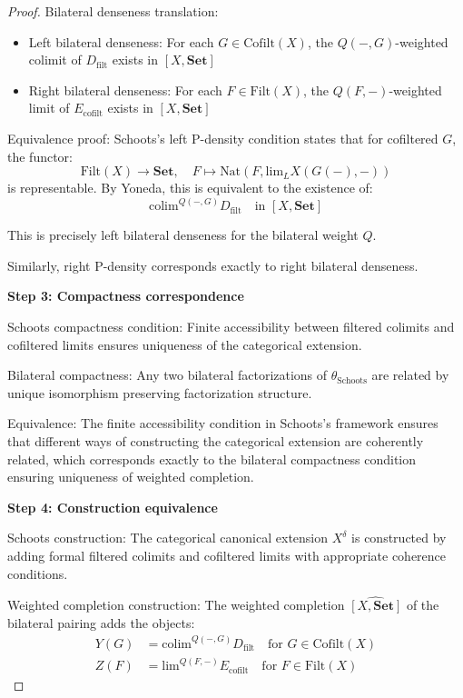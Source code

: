 \documentclass[11pt]{article}
\theoremstyle{plain}
\theoremstyle{definition}
\theoremstyle{remark}
\newcommand{\colim}{\mathrm{colim}}
\renewcommand{\lim}{\mathrm{lim}}
\newcommand{\wh}[1]{\widehat{#1}}
\begin{document}
\begin{proof}
Bilateral denseness translation:
\begin{itemize}
\item Left bilateral denseness: For each $G \in \text{Cofilt}(X)$, the $Q(-, G)$-weighted colimit of $D_{\text{filt}}$ exists in $[X, \mathbf{Set}]$
\item Right bilateral denseness: For each $F \in \text{Filt}(X)$, the $Q(F, -)$-weighted limit of $E_{\text{cofilt}}$ exists in $[X, \mathbf{Set}]$
\end{itemize}

Equivalence proof: 
Schoots's left P-density condition states that for cofiltered $G$, the functor:
$$\text{Filt}(X) \to \mathbf{Set}, \quad F \mapsto \text{Nat}(F, \lim_L X(G(-), -))$$
is representable. By Yoneda, this is equivalent to the existence of:
$$\colim^{Q(-, G)} D_{\text{filt}} \quad \text{in } [X, \mathbf{Set}]$$

This is precisely left bilateral denseness for the bilateral weight $Q$.

Similarly, right P-density corresponds exactly to right bilateral denseness.

\textbf{Step 3: Compactness correspondence}

Schoots compactness condition: Finite accessibility between filtered colimits and cofiltered limits ensures uniqueness of the categorical extension.

Bilateral compactness: Any two bilateral factorizations of $\theta_{\text{Schoots}}$ are related by unique isomorphism preserving factorization structure.

Equivalence: The finite accessibility condition in Schoots's framework ensures that different ways of constructing the categorical extension are coherently related, which corresponds exactly to the bilateral compactness condition ensuring uniqueness of weighted completion.

\textbf{Step 4: Construction equivalence}

Schoots construction: The categorical canonical extension $X^{\delta}$ is constructed by adding formal filtered colimits and cofiltered limits with appropriate coherence conditions.

Weighted completion construction: The weighted completion $\wh{[X, \mathbf{Set}]}$ of the bilateral pairing adds the objects:
\begin{align}
Y(G) &= \colim^{Q(-, G)} D_{\text{filt}} \quad \text{for } G \in \text{Cofilt}(X) \\
Z(F) &= \lim^{Q(F, -)} E_{\text{cofilt}} \quad \text{for } F \in \text{Filt}(X)
\end{align}


\end{proof}
\end{document}
